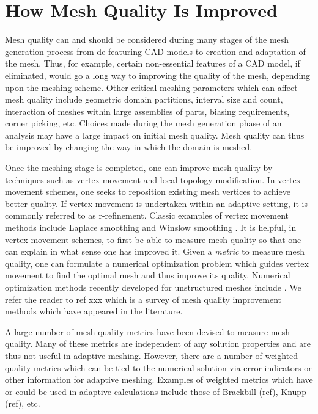 \section{How Mesh Quality Is Improved}
Mesh quality can and should be considered during many stages of 
the mesh generation process from de-featuring CAD models to  
creation and adaptation of the mesh. Thus, for example, certain
non-essential features of a CAD model, if eliminated, would go a 
long way to improving the quality of the mesh, depending upon
the meshing scheme. Other critical meshing parameters which can 
affect mesh quality include geometric domain partitions, interval size
and count, interaction of meshes within large assemblies of parts, 
biasing requirements, corner picking, etc. Choices made during the 
mesh generation phase of an analysis may have a large impact on 
initial mesh quality.  Mesh quality can thus be improved by changing the 
way in which the domain is meshed. \newline

Once the meshing stage is completed, one can improve mesh quality
by techniques such as vertex movement and local topology modification.
In vertex movement schemes, one seeks to reposition existing mesh vertices to 
achieve better quality. If vertex movement is undertaken within an adaptive 
setting, it is commonly referred to as r-refinement. 
Classic examples of vertex movement methods 
include Laplace smoothing \cite{F88} and Winslow smoothing \cite{Winslow}. 
It is helpful, in vertex movement schemes, to first be 
able to measure mesh quality so that one can explain in what sense one 
has improved it. Given a {\it metric} to measure mesh quality, 
one can formulate a numerical 
optimization problem which guides vertex movement to find the optimal 
mesh and thus improve its quality.  Numerical 
optimization methods recently
developed for unstructured meshes include \cite{Opt-MS,Kn00,FrKn01,
FeasNewt,bjoe:swap,bjoe:chain-swap,es92}. We refer the reader to ref xxx
which is a survey of mesh quality improvement methods which have appeared 
in the literature. \newline

A large number of mesh quality metrics have been devised to measure 
mesh quality. Many of these metrics are independent of any solution 
properties and are thus not useful in adaptive meshing. However, there
are a number of weighted quality metrics which can be tied to the 
numerical solution via error indicators or other information for adaptive 
meshing. Examples of weighted metrics which have or could be used in 
adaptive calculations include those of Brackbill (ref), Knupp (ref), etc. \newline

